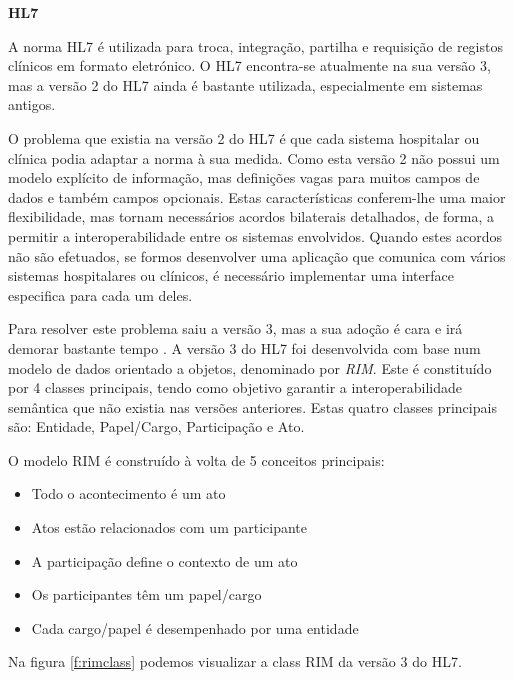 \textbf{HL7}
\par
A norma HL7 é utilizada para troca, integração, partilha e requisição de  registos clínicos em formato eletrónico\cite{hl7}.
O HL7 encontra-se atualmente na sua versão 3\cite{corepointhealth}, mas a versão 2 do \gls{HL7} ainda é bastante utilizada, especialmente em sistemas antigos. 
\par
O problema que existia na versão 2 do \gls{HL7} é que cada sistema hospitalar ou clínica podia adaptar a norma à sua medida. Como esta versão 2 não possui um modelo explícito de informação, mas definições vagas para muitos campos de dados e também campos opcionais. Estas características conferem-lhe uma maior flexibilidade, mas tornam necessários acordos bilaterais detalhados, de forma, a permitir a interoperabilidade entre os sistemas envolvidos. Quando estes acordos não são efetuados, se formos desenvolver uma aplicação que comunica com vários sistemas hospitalares ou clínicos, é necessário implementar uma interface especifica para cada um deles.
\par
Para resolver este problema saiu a versão 3, mas a sua adoção é cara e irá demorar bastante tempo \cite{corepointhealth}.
A versão 3 do HL7 foi desenvolvida com base num modelo de dados orientado a objetos, denominado por \textit{\gls{RIM}}. Este é constituído por 4 classes principais, tendo como objetivo garantir a interoperabilidade semântica que não existia nas versões anteriores. Estas quatro classes principais são: Entidade, Papel/Cargo, Participação e Ato\cite{hl7-rim}.
\par 
O modelo \gls{RIM} é construído à volta de 5 conceitos principais:
\begin{itemize}
  \item Todo o acontecimento é um ato
  \item Atos estão relacionados com um participante
  \item A participação define o contexto de um ato
  \item Os participantes têm um papel/cargo
  \item Cada cargo/papel é desempenhado por uma entidade
\end{itemize}

Na figura \ref{f:rimclass} podemos visualizar a class \gls{RIM} da versão 3 do HL7.

